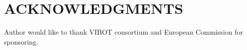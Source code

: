 \documentclass[a4paper, 10pt, conference]{ieeeconf}        %
\begin{document}
\section{ACKNOWLEDGMENTS}
Author would like to thank VIBOT consortium and European Commission for sponsoring.  



\end{document}
